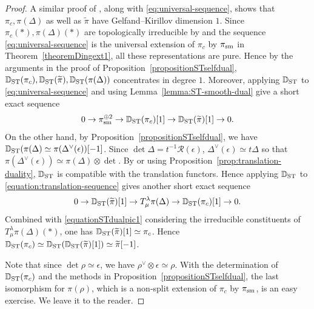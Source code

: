 \documentclass[a4paper,10pt]{amsart}
\theoremstyle{remark}
\theoremstyle{definition}
\theoremstyle{plain}
\numberwithin{equation}{section}
\newcommand{\bbD}{{\mathbb D}}
\newcommand{\calR}{{\mathcal R}}
\newcommand{\sm}{{\rm sm}}
\newcommand{\ST}{{\rm ST}}
\begin{document}
\begin{proof}
	A similar proof of \cite[Thm.~3.11]{li2026locallyanalyticvectorscompleted}, along with \eqref{eq:universal-sequence}, shows that $\pi_c,\pi(\Delta)$ as well as $\widetilde{\pi}$ have Gelfand--Kirillov dimension $1$. Since $\pi_c(*),\pi(\Delta)(*)$ are topologically irreducible by \cite[Cor.~0.4]{colmez2018poids} and the sequence \eqref{eq:universal-sequence} is the universal extension of $\pi_c$ by $\pi_{\sm}$ in Theorem~\ref{theoremDingext1}, all these representations are pure. Hence by the arguments in the proof of Proposition~\ref{propositionSTselfdual}, $\bbD_{\ST}(\pi_c),\bbD_{\ST}(\widetilde{\pi}),\bbD_{\ST}(\pi(\Delta))$ concentrates in degree $1$. Moreover, applying $\bbD_{\ST}$ to \eqref{eq:universal-sequence} and using Lemma~\ref{lemma:ST-smooth-dual} give a short exact sequence
	\begin{equation}\label{equationSTdualpic1}
		0\rightarrow\pi_{\rm sm}^{\oplus 2}\rightarrow\bbD_{\ST}(\pi_c)[1]\rightarrow \bbD_{\ST}(\widetilde{\pi})[1]\rightarrow 0.
	\end{equation}
	On the other hand, by Proposition~\ref{propositionSTselfdual}, we have $\bbD_{\ST}(\pi(\Delta)\simeq\pi(\Delta^{\vee}(\epsilon))[-1]$. Since $\det \Delta= t^{-1}\calR(\epsilon)$, $\Delta^{\vee}(\epsilon)\simeq t\Delta$ so that $\pi(\Delta^{\vee}(\epsilon))\simeq \pi(\Delta)\otimes \det$. By \cite[Cor.~3.2.14(3)]{JC23} or using Proposition~\ref{prop:translation-duality}, $\bbD_{\ST}$ is compatible with the translation functors. Hence applying $\bbD_{\ST}$ to \eqref{equation:translation-sequence} gives another short exact sequence
	\[0\rightarrow \bbD_{\ST}(\widetilde{\pi})[1]\rightarrow T_{\mu}^{\lambda}\pi(\Delta)\rightarrow \bbD_{\ST}(\pi_c)[1]\rightarrow 0.\]
	Combined with \eqref{equationSTdualpic1} considering the irreducible constituents of $T_{\mu}^{\lambda}\pi(\Delta)(*)$, one has $\bbD_{\ST}(\widetilde{\pi})[1]\simeq \pi_c$. Hence $\bbD_{\rm ST}(\pi_c)\simeq \bbD_{\ST}(\bbD_{\ST}(\widetilde{\pi})[1])\simeq \widetilde{\pi}[-1]$.

	Note that since $\det \rho\simeq \epsilon$, we have $\rho^{\vee}\otimes\epsilon\simeq \rho$. With the determination of $\bbD_{\ST}(\pi_c)$ and the methods in Proposition~\ref{propositionSTselfdual}, the last isomorphism for $\pi(\rho)$, which is a non-split extension of $\pi_c$ by $\pi_{\sm}$, is an easy exercise. We leave it to the reader.
\end{proof}
\end{document}
